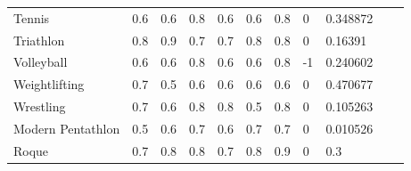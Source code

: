 \documentclass[a4paper]{article}
\begin{document}
\begin{table}[h]
\begin{tabular}{|l|lllllll|l|ll}
    Tennis                                      & \multicolumn{1}{l|}{0.6}      & \multicolumn{1}{l|}{0.6}      & \multicolumn{1}{l|}{0.8}  & \multicolumn{1}{l|}{0.6}  & \multicolumn{1}{l|}{0.6}  & \multicolumn{1}{l|}{0.8}      & 0                       & 0.348872                                               &  &  \\ \cline{1-9}
    Triathlon                                   & \multicolumn{1}{l|}{0.8}      & \multicolumn{1}{l|}{0.9}      & \multicolumn{1}{l|}{0.7}  & \multicolumn{1}{l|}{0.7}  & \multicolumn{1}{l|}{0.8}  & \multicolumn{1}{l|}{0.8}      & 0                       & 0.16391                                                &  &  \\ \cline{1-9}
    Volleyball                                  & \multicolumn{1}{l|}{0.6}      & \multicolumn{1}{l|}{0.6}      & \multicolumn{1}{l|}{0.8}  & \multicolumn{1}{l|}{0.6}  & \multicolumn{1}{l|}{0.6}  & \multicolumn{1}{l|}{0.8}      & -1                      & 0.240602                                               &  &  \\ \cline{1-9}
    Weightlifting                               & \multicolumn{1}{l|}{0.7}      & \multicolumn{1}{l|}{0.5}      & \multicolumn{1}{l|}{0.6}  & \multicolumn{1}{l|}{0.6}  & \multicolumn{1}{l|}{0.6}  & \multicolumn{1}{l|}{0.6}      & 0                       & 0.470677                                               &  &  \\ \cline{1-9}
    Wrestling                                   & \multicolumn{1}{l|}{0.7}      & \multicolumn{1}{l|}{0.6}      & \multicolumn{1}{l|}{0.8}  & \multicolumn{1}{l|}{0.8}  & \multicolumn{1}{l|}{0.5}  & \multicolumn{1}{l|}{0.8}      & 0                       & 0.105263                                               &  &  \\ \cline{1-9}
    Modern Pentathlon                           & \multicolumn{1}{l|}{0.5}      & \multicolumn{1}{l|}{0.6}      & \multicolumn{1}{l|}{0.7}  & \multicolumn{1}{l|}{0.6}  & \multicolumn{1}{l|}{0.7}  & \multicolumn{1}{l|}{0.7}      & 0                       & 0.010526                                               &  &  \\ \cline{1-9}
    Roque                                       & \multicolumn{1}{l|}{0.7}      & \multicolumn{1}{l|}{0.8}      & \multicolumn{1}{l|}{0.8}  & \multicolumn{1}{l|}{0.7}  & \multicolumn{1}{l|}{0.8}  & \multicolumn{1}{l|}{0.9}      & 0                       & 0.3                                                    &  &  \\ \cline{1-9}
    \end{tabular}
    \end{table}
    \\[30em]
\end{document}
